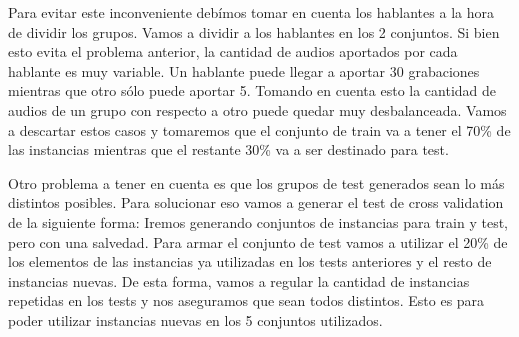 \documentclass[11pt,a4paper,twoside]{tesis}
\begin{document}
Para evitar este inconveniente debímos tomar en cuenta los hablantes a la hora de dividir los grupos. Vamos a dividir a los hablantes en los 2 conjuntos. Si bien esto evita el problema anterior, la cantidad de audios aportados por cada hablante es muy variable. Un hablante puede llegar a aportar 30 grabaciones mientras que otro sólo puede aportar 5. Tomando en cuenta esto la cantidad de audios de un grupo con respecto a otro puede quedar muy desbalanceada. Vamos a descartar estos casos y tomaremos que el conjunto de train va a tener el 70\% de las instancias mientras que el restante 30\% va a ser destinado para test.

Otro problema a tener en cuenta es que los grupos de test generados sean lo más distintos posibles. Para solucionar eso vamos a generar el test de cross validation de la siguiente forma: Iremos generando conjuntos de instancias para train y test, pero con una salvedad. Para armar el conjunto de test vamos a utilizar el 20\% de los elementos de las instancias ya utilizadas en los tests anteriores y el resto de instancias nuevas. De esta forma, vamos a regular la cantidad de instancias repetidas en los tests y nos aseguramos que sean todos distintos. Esto es para poder utilizar instancias nuevas en los 5 conjuntos utilizados. 
\end{document}
